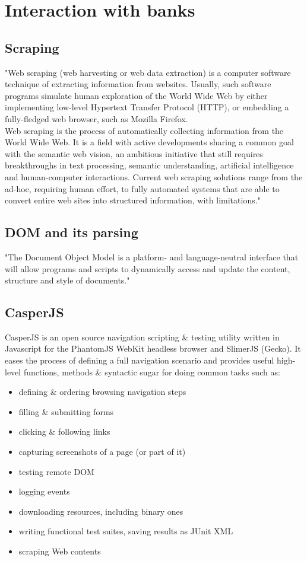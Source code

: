 \chapter{Interaction with banks}
	\section{Scraping}
	"Web scraping (web harvesting or web data extraction) is a computer software technique of extracting information from websites. Usually, such software programs simulate human exploration of the World Wide Web by either implementing low-level Hypertext Transfer Protocol (HTTP), or embedding a fully-fledged web browser, such as Mozilla Firefox.\\
	Web scraping is the process of automatically collecting information from the World Wide Web. It is a field with active developments sharing a common goal with the semantic web vision, an ambitious initiative that still requires breakthroughs in text processing, semantic understanding, artificial intelligence and human-computer interactions. Current web scraping solutions range from the ad-hoc, requiring human effort, to fully automated systems that are able to convert entire web sites into structured information, with limitations." \cite{wikiScraping}
	\section{DOM and its parsing}
	"The Document Object Model is a platform- and language-neutral interface that will allow programs and scripts to dynamically access and update the content, structure and style of documents." \cite{w3cDOM}
	\section{CasperJS}
		\cite{casperjs}
		CasperJS is an open source navigation scripting \& testing utility written in Javascript for the PhantomJS WebKit headless browser and SlimerJS (Gecko). It eases the process of defining a full navigation scenario and provides useful high-level functions, methods \& syntactic sugar for doing common tasks such as:
\begin{itemize}
	\item defining \& ordering browsing navigation steps
	\item filling \& submitting forms
	\item clicking \& following links
	\item capturing screenshots of a page (or part of it)
	\item testing remote DOM
	\item logging events
	\item downloading resources, including binary ones
	\item writing functional test suites, saving results as JUnit XML
	\item scraping Web contents
\end{itemize}

	
